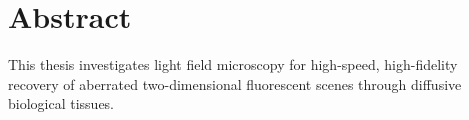 \chapter*{Abstract}

This thesis investigates light field microscopy for high-speed, high-fidelity
recovery of aberrated two-dimensional fluorescent scenes through diffusive
biological tissues.

